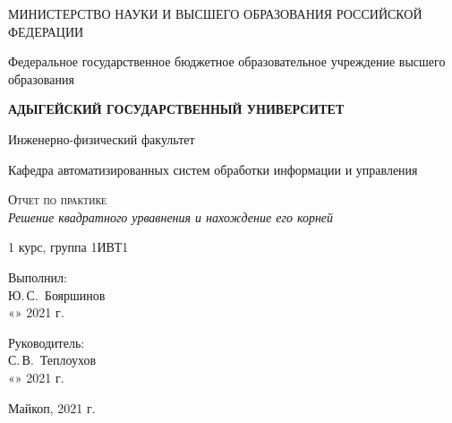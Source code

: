 \documentclass[12pt,a4paper]{scrartcl}
\begin{document}
	\begin{titlepage}
		\begin{center}
			\large
			МИНИСТЕРСТВО НАУКИ И ВЫСШЕГО ОБРАЗОВАНИЯ РОССИЙСКОЙ ФЕДЕРАЦИИ
			
			Федеральное государственное бюджетное образовательное учреждение высшего образования
			
			\textbf{АДЫГЕЙСКИЙ ГОСУДАРСТВЕННЫЙ УНИВЕРСИТЕТ}
			\vspace{0.25cm}
			
			Инженерно-физический факультет
			
			Кафедра автоматизированных систем обработки информации и управления
			\vfill

			\vfill
			
			\textsc{Отчет по практике}\\[5mm]
			
			{\LARGE \textit{Решение квадратного урвавнения и нахождение его корней}}
			\bigskip
			
			1 курс, группа 1ИВТ1
		\end{center}
		\vfill
		
		\newlength{\ML}
		\hfill\begin{minipage}{0.5\textwidth}
			Выполнил:\\
			\underline{\hspace{\ML}} Ю.\,С.~Бояршинов\\
			«\underline{\hspace{0.7cm}}» \underline{\hspace{2cm}} 2021 г.
		\end{minipage}%
		\bigskip
		
		\hfill\begin{minipage}{0.5\textwidth}
			Руководитель:\\
			\underline{\hspace{\ML}} С.\,В.~Теплоухов\\
			«\underline{\hspace{0.7cm}}» \underline{\hspace{2cm}} 2021 г.
		\end{minipage}%
		\vfill
	
		\begin{center}
			Майкоп, 2021 г.
		\end{center}
	\end{titlepage}
\end{document}

